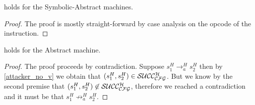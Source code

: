 \begin{lemma}
  \label{cfg_equiv_SA}
   holds for the Symbolic-Abstract machines.
\end{lemma}
\begin{proof}
  The proof is mostly straight-forward by case analysis on the
  opcode of the instruction.
\end{proof}

\begin{lemma}
  \label{av_no_attacker_A}
   holds for the Abstract machine.
\end{lemma}
\begin{proof}
  The proof proceeds by contradiction. 
  Suppose $s^H_1 \to^H_a s^H_2$ then by \cref{attacker_no_v}
  we obtain that $(s^H_1,s^H_2) \in \mathcal{SUCC_\mathcal{CFG}^{H}}$. But we know
  by the second premise that $(s^H_1,s^H_2) \not \in \mathcal{SUCC_\mathcal{CFG}^{H}}$,
  therefore we reached a contradiction and it must be that
  $s^H_1 \not \to^H_a s^H_2$.
\end{proof}

